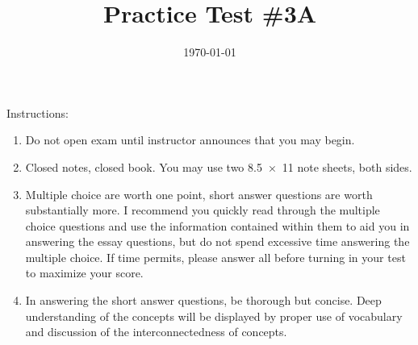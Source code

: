 \documentclass[exam,addpoints,answers]{exam}
\title{Practice Test \#3A}
\date{\today}
\author{\mobeardInstructorShort}
\begin{document}
\maketitle
\vfill
\mobeardExamNameBlock
\vfill
Instructions: 
\begin{enumerate}
\item Do not open exam until instructor announces that you may begin.
\item Closed notes, closed book.  You may use two \SI{8.5x11}{\inch} note sheets, both sides.
\item Multiple choice are worth one point, short answer questions are worth substantially more. I recommend you quickly read through the multiple choice questions and use the information contained within them to aid you in answering the essay questions, but do not spend excessive time answering the multiple choice. If time permits, please answer all before turning in your test to maximize your score.
\item In answering the short answer questions, be thorough but concise. Deep understanding of the concepts will be displayed by proper use of vocabulary and discussion of the interconnectedness of concepts.
\end{enumerate}
\vfill
\begin{center}
\gradetable[h][questions]
\end{center}
\clearpage
\end{document}
